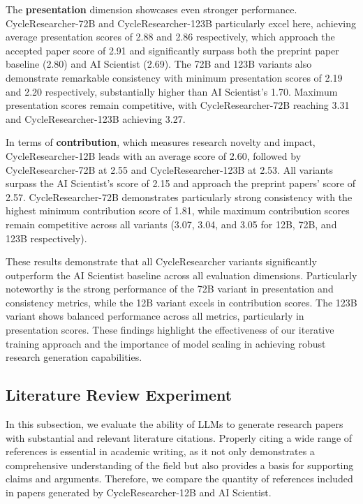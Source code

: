 \documentclass{article} %
\begin{document}
The \textbf{presentation} dimension showcases even stronger performance. CycleResearcher-72B and CycleResearcher-123B particularly excel here, achieving average presentation scores of 2.88 and 2.86 respectively, which approach the accepted paper score of 2.91 and significantly surpass both the preprint paper baseline (2.80) and AI Scientist (2.69). The 72B and 123B variants also demonstrate remarkable consistency with minimum presentation scores of 2.19 and 2.20 respectively, substantially higher than AI Scientist's 1.70. Maximum presentation scores remain competitive, with CycleResearcher-72B reaching 3.31 and CycleResearcher-123B achieving 3.27.

In terms of \textbf{contribution}, which measures research novelty and impact, CycleResearcher-12B leads with an average score of 2.60, followed by CycleResearcher-72B at 2.55 and CycleResearcher-123B at 2.53. All variants surpass the AI Scientist's score of 2.15 and approach the preprint papers' score of 2.57. CycleResearcher-72B demonstrates particularly strong consistency with the highest minimum contribution score of 1.81, while maximum contribution scores remain competitive across all variants (3.07, 3.04, and 3.05 for 12B, 72B, and 123B respectively).

These results demonstrate that all CycleResearcher variants significantly outperform the AI Scientist baseline across all evaluation dimensions. Particularly noteworthy is the strong performance of the 72B variant in presentation and consistency metrics, while the 12B variant excels in contribution scores. The 123B variant shows balanced performance across all metrics, particularly in presentation scores. These findings highlight the effectiveness of our iterative training approach and the importance of model scaling in achieving robust research generation capabilities.

\subsection{Literature Review Experiment}

In this subsection, we evaluate the ability of LLMs to generate research papers with substantial and relevant literature citations. Properly citing a wide range of references is essential in academic writing, as it not only demonstrates a comprehensive understanding of the field but also provides a basis for supporting claims and arguments. Therefore, we compare the quantity of references included in papers generated by CycleResearcher-12B and AI Scientist.
\end{document}
